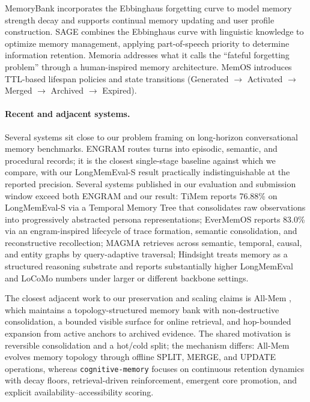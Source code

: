 \documentclass[11pt,a4paper]{article}
\begin{document}
MemoryBank \citep{zhong2024memorybank} incorporates the Ebbinghaus forgetting curve to model memory strength decay and supports continual memory updating and user profile construction. SAGE \citep{sage2024} combines the Ebbinghaus curve with linguistic knowledge to optimize memory management, applying part-of-speech priority to determine information retention. Memoria \citep{memoria2023} addresses what it calls the ``fateful forgetting problem'' through a human-inspired memory architecture. MemOS \citep{kang2025memos} introduces TTL-based lifespan policies and state transitions (Generated $\rightarrow$ Activated $\rightarrow$ Merged $\rightarrow$ Archived $\rightarrow$ Expired).

\paragraph{Recent and adjacent systems.} Several systems sit close to our problem framing on long-horizon conversational memory benchmarks. ENGRAM \citep{patel2025engram} routes turns into episodic, semantic, and procedural records; it is the closest single-stage baseline against which we compare, with our LongMemEval-S result practically indistinguishable at the reported precision. Several systems published in our evaluation and submission window exceed both ENGRAM and our result: TiMem \citep{li2026timem} reports 76.88\% on LongMemEval-S via a Temporal Memory Tree that consolidates raw observations into progressively abstracted persona representations; EverMemOS \citep{hu2026evermemos} reports 83.0\% via an engram-inspired lifecycle of trace formation, semantic consolidation, and reconstructive recollection; MAGMA \citep{jiang2026magma} retrieves across semantic, temporal, causal, and entity graphs by query-adaptive traversal; Hindsight \citep{latimer2025hindsight} treats memory as a structured reasoning substrate and reports substantially higher LongMemEval and LoCoMo numbers under larger or different backbone settings.

The closest adjacent work to our preservation and scaling claims is All-Mem \citep{lv2026allmem}, which maintains a topology-structured memory bank with non-destructive consolidation, a bounded visible surface for online retrieval, and hop-bounded expansion from active anchors to archived evidence. The shared motivation is reversible consolidation and a hot/cold split; the mechanism differs: All-Mem evolves memory topology through offline SPLIT, MERGE, and UPDATE operations, whereas \texttt{cognitive-memory} focuses on continuous retention dynamics with decay floors, retrieval-driven reinforcement, emergent core promotion, and explicit availability--accessibility scoring.
\end{document}
